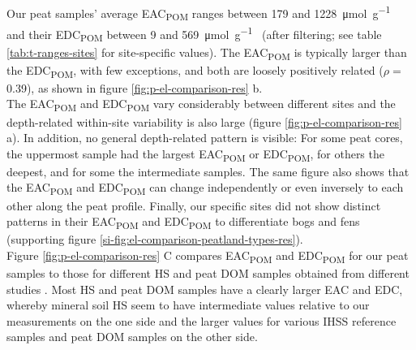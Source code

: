 \documentclass[draft,linenumbers]{agujournal2018}
\begin{document}
Our peat samples' average EAC\textsubscript{POM} ranges between 179 and
\SI{1228}{\micro\mol\per\g\carbon} and their EDC\textsubscript{POM}
between 9 and \SI{569}{\micro\mol\per\g\carbon} (after filtering; see
table \ref{tab:t-ranges-sites} for site-specific values). The
EAC\textsubscript{POM} is typically larger than the
EDC\textsubscript{POM}, with few exceptions, and both are loosely
positively related (\(\rho=\) 0.39), as shown in figure
\ref{fig:p-el-comparison-res} b.\\
The EAC\textsubscript{POM} and EDC\textsubscript{POM} vary considerably
between different sites and the depth-related within-site variability is
also large (figure \ref{fig:p-el-comparison-res} a). In addition, no
general depth-related pattern is visible: For some peat cores, the
uppermost sample had the largest EAC\textsubscript{POM} or
EDC\textsubscript{POM}, for others the deepest, and for some the
intermediate samples. The same figure also shows that the
EAC\textsubscript{POM} and EDC\textsubscript{POM} can change
independently or even inversely to each other along the peat profile.
Finally, our specific sites did not show distinct patterns in their
EAC\textsubscript{POM} and EDC\textsubscript{POM} to differentiate bogs
and fens (supporting figure
\ref{si-fig:el-comparison-peatland-types-res}).\\
Figure \ref{fig:p-el-comparison-res} C compares EAC\textsubscript{POM}
and EDC\textsubscript{POM} for our peat samples to those for different
HS and peat DOM samples obtained from different studies
\citep{Aeschbacher.2012, Tan.2017, Walpen.2018}. Most HS and peat DOM
samples have a clearly larger EAC and EDC, whereby mineral soil HS
\citep{Tan.2017} seem to have intermediate values relative to our
measurements on the one side and the larger values for various IHSS
reference samples \citep{Aeschbacher.2012} and peat DOM samples
\citep{Walpen.2018} on the other side.
\end{document}
